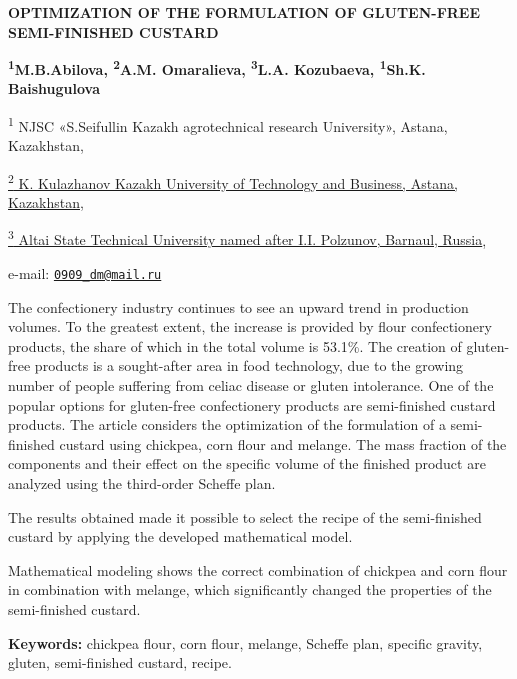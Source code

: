 \begin{articleheader}
{\bfseries OPTIMIZATION OF THE FORMULATION OF GLUTEN-FREE SEMI-FINISHED
CUSTARD}

{\bfseries \textsuperscript{1}M.B.Abilova\textsuperscript{\envelope },
\textsuperscript{2}A.M. Omaralieva, \textsuperscript{3}L.A. Kozubaeva,
\textsuperscript{1}Sh.K. Baishugulova}
\end{articleheader}

\begin{affiliation}
\textsuperscript{1} NJSC «S.Seifullin Kazakh agrotechnical research
University», Astana, Kazakhstan,

\href{https://bankchart.kz/spravochniki/pochtovyye_indeksy/id/116470}{\textsuperscript{2}
K. Kulazhanov Kazakh University of Technology and Business, Astana,
Kazakhstan,}

\href{https://bankchart.kz/spravochniki/pochtovyye_indeksy/id/116470}{\textsuperscript{3}
Altai State Technical University named after I.I. Polzunov, Barnaul,
Russia},

e-mail: \href{mailto:0909_dm@mail.ru}{\nolinkurl{0909\_dm@mail.ru}}
\end{affiliation}

The confectionery industry continues to see an upward trend in
production volumes. To the greatest extent, the increase is provided by
flour confectionery products, the share of which in the total volume is
53.1\%. The creation of gluten-free products is a sought-after area in
food technology, due to the growing number of people suffering from
celiac disease or gluten intolerance. One of the popular options for
gluten-free confectionery products are semi-finished custard products.
The article considers the optimization of the formulation of a
semi-finished custard using chickpea, corn flour and melange. The mass
fraction of the components and their effect on the specific volume of
the finished product are analyzed using the third-order Scheffe plan.

The results obtained made it possible to select the recipe of the
semi-finished custard by applying the developed mathematical model.

Mathematical modeling shows the correct combination of chickpea and corn
flour in combination with melange, which significantly changed the
properties of the semi-finished custard.

{\bfseries Keywords:} chickpea flour, corn flour, melange, Scheffe plan,
specific gravity, gluten, semi-finished custard, recipe.

